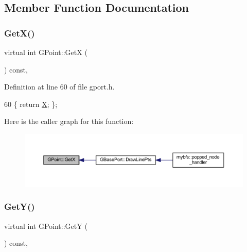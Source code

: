 \subsection{Member Function Documentation}
\mbox{\label{class_g_point_a1abafe0e52e3f7039bbe0c0acbb5a9a9}} 
\subsubsection{\texorpdfstring{Get\+X()}{GetX()}}
{\footnotesize\ttfamily virtual int G\+Point\+::\+GetX (\begin{DoxyParamCaption}{ }\end{DoxyParamCaption}) const\hspace{0.3cm}{\ttfamily [inline]}, {\ttfamily [virtual]}}



Definition at line 60 of file gport.\+h.


\begin{DoxyCode}
60 \{ \textcolor{keywordflow}{return} \mbox{\hyperlink{class_g_point_a0a26572e08c37a5e7e6854ae8c7fee66}{X}}; \};
\end{DoxyCode}
Here is the caller graph for this function\+:\nopagebreak
\begin{figure}[H]
\begin{center}
\leavevmode
\includegraphics[width=350pt]{class_g_point_a1abafe0e52e3f7039bbe0c0acbb5a9a9_icgraph}
\end{center}
\end{figure}
\mbox{\label{class_g_point_a0b40736448fc178ac2406875bd524a2c}} 
\subsubsection{\texorpdfstring{Get\+Y()}{GetY()}}
{\footnotesize\ttfamily virtual int G\+Point\+::\+GetY (\begin{DoxyParamCaption}{ }\end{DoxyParamCaption}) const\hspace{0.3cm}{\ttfamily [inline]}, {\ttfamily [virtual]}}




